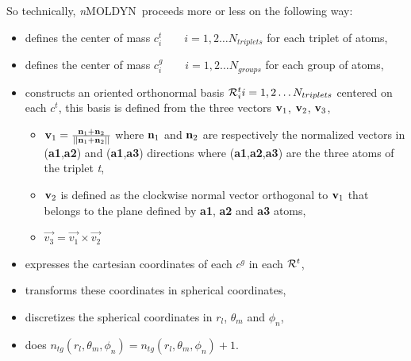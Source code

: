 \documentclass[a4paper,11pt]{report}
\newcommand{\NMOLDYN}{\textit{n}MOLDYN}
\begin{document}
So technically, \NMOLDYN\ proceeds more or less on the following way:
\begin{itemize}
\item defines the center of mass $c^t_i \qquad i = 1, 2 \ldots N_{triplets}$ for each triplet of atoms,
\item defines the center of mass $c^g_i \qquad i = 1, 2 \ldots N_{groups}$ for each group of atoms,
\item constructs an oriented orthonormal basis ${\cal R}^t_i i = 1, 2 \ldots N_{triplets}$ centered on each $c^t$, this 
basis is defined from the three vectors ${\bf v}_1$, ${\bf v}_2$, ${\bf v}_3$,
\begin{itemize}
\item ${\bf v}_1 = \frac{{\bf n}_{1} + {\bf n}_{2}}{||{\bf n}_{1} + {\bf n}_{2}||}$
where ${\bf n}_{1}$ and ${\bf n}_{2}$ are respectively the normalized vectors in (\textbf{a1},\textbf{a2}) 
and (\textbf{a1},\textbf{a3}) directions where (\textbf{a1},\textbf{a2},\textbf{a3}) are the three atoms of the triplet \textit{t},
\item ${\bf v}_2$ is defined as the clockwise normal vector orthogonal to ${\bf v}_1$ that belongs to the plane 
defined by \textbf{a1}, \textbf{a2} and \textbf{a3} atoms,
\item $\vec{v_3} = \vec{v_1} \times \vec{v_2}$
\end{itemize}
\item expresses the cartesian coordinates of each $c^g$ in each ${\cal R}^t$,
\item transforms these coordinates in spherical coordinates,
\item discretizes the spherical coordinates in $r_l$, $\theta_m$ and $\phi_n$,
\item does $n_{tg}(r_l,\theta_m,\phi_n) = n_{tg}(r_l,\theta_m,\phi_n) + 1$.
\end{itemize}
\end{document}
